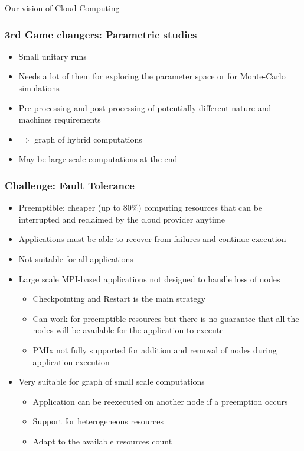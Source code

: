 \documentclass[10pt,aspectratio=1609]{beamer}
\begin{document}
\begin{section}{Our vision of Cloud Computing}
\begin{frame}
  \frametitle{3rd Game changers: Parametric studies}

  \begin{itemize}
    \item Small unitary runs
    \item Needs a lot of them for exploring the parameter space or for Monte-Carlo simulations
    \item Pre-processing and post-processing of potentially different nature and machines requirements
    \item $\Rightarrow$ graph of hybrid computations
    \item May be large scale computations at the end
  \end{itemize}
\end{frame}

\begin{frame}
  \frametitle{Challenge: Fault Tolerance}

  \begin{itemize}
    \item Preemptible: cheaper (up to 80\%) computing resources that can be interrupted and reclaimed by the cloud provider anytime
    \item Applications must be able to recover from failures and continue execution
    \item Not suitable for all applications
    \item Large scale MPI-based applications not designed to handle loss of nodes
    \begin{itemize}
      \item Checkpointing and Restart is the main strategy
      \item Can work for preemptible resources but there is no guarantee that all the nodes will be available for the application to execute
      \item PMIx not fully supported for addition and removal of nodes during application execution
    \end{itemize}
    \item Very suitable for graph of small scale computations
    \begin{itemize}
      \item Application can be reexecuted on another node if a preemption occurs
      \item Support for heterogeneous resources
      \item Adapt to the available resources count
    \end{itemize}
  \end{itemize}
\end{frame}



\end{section}
\end{document}
